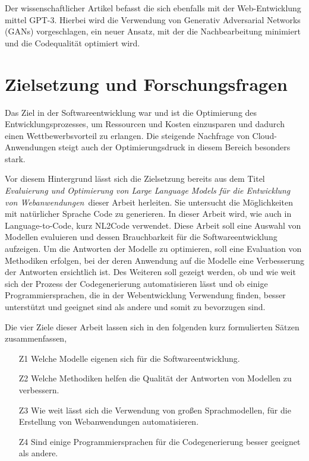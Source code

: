Der wissenschaftlicher Artikel \cite{nataraj-2024} befasst die sich ebenfalls mit der Web-Entwicklung mittel GPT-3. Hierbei wird die Verwendung von Generativ Adversarial Networks (GANs) vorgeschlagen, ein neuer Ansatz, mit der die Nachbearbeitung minimiert und die Codequalität optimiert wird.

\section{Zielsetzung und Forschungsfragen}
Das Ziel in der Softwareentwicklung war und ist die Optimierung des Entwicklungsprozesses, um Ressourcen und Kosten einzusparen und dadurch einen Wettbewerbsvorteil zu erlangen. Die steigende Nachfrage von Cloud-Anwendungen steigt auch der Optimierungsdruck in diesem Bereich besonders stark.\vspace{0.2cm}

Vor diesem Hintergrund lässt sich die Zielsetzung bereits aus dem Titel \glqq \textit{Evaluierung und Optimierung von Large Language Models für die Entwicklung von Webanwendungen}\grqq \ dieser Arbeit herleiten. Sie untersucht die Möglichkeiten mit natürlicher Sprache Code zu generieren. In dieser Arbeit wird, wie auch in \cite[vgl. Seite 2]{jiang-2024} Language-to-Code, kurz NL2Code verwendet. Diese Arbeit soll eine Auswahl von Modellen evaluieren und dessen Brauchbarkeit für die Softwareentwicklung aufzeigen. Um die Antworten der Modelle zu optimieren, soll eine Evaluation von Methodiken erfolgen, bei der deren Anwendung auf die Modelle eine Verbesserung der Antworten ersichtlich ist. Des Weiteren soll gezeigt werden, ob und wie weit sich der Prozess der Codegenerierung automatisieren lässt und ob einige Programmiersprachen, die in der Webentwicklung Verwendung finden, besser unterstützt und geeignet sind als andere und somit zu bevorzugen sind.\vspace{0.2cm}

Die vier Ziele dieser Arbeit lassen sich in den folgenden kurz formulierten Sätzen zusammenfassen,

\begin{itemize}
	\item[Z1] Welche Modelle eigenen sich für die Softwareentwicklung.
	\item[Z2] Welche Methodiken helfen die Qualität der Antworten von Modellen zu verbessern.
	\item[Z3] Wie weit lässt sich die Verwendung von großen Sprachmodellen, für die Erstellung von Webanwendungen automatisieren.
	\item[Z4] Sind einige Programmiersprachen für die Codegenerierung besser geeignet als andere.
\end{itemize}

